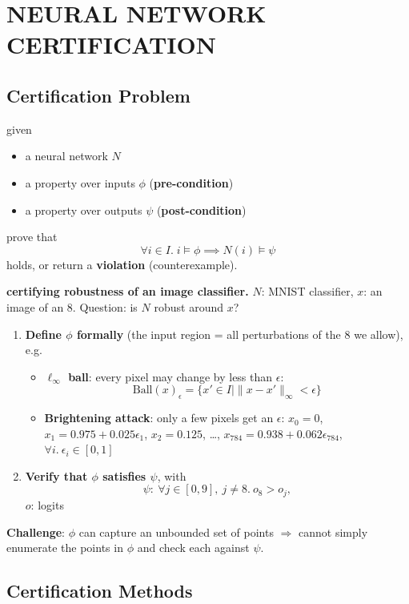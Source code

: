 \section{NEURAL NETWORK CERTIFICATION}

\subsection{Certification Problem}

 given
\begin{itemize}
  \item a neural network $N$
  \item a property over inputs $\phi$ (\textbf{pre-condition})
  \item a property over outputs $\psi$ (\textbf{post-condition})
\end{itemize}
prove that
\[
  \forall i \in I.\; i \models \phi \implies N(i) \models \psi
\]
holds, or return a \textbf{violation} (counterexample).

\example{} \textbf{certifying robustness of an image classifier.} $N$: MNIST classifier,
$x$: an image of an 8.
Question: is $N$ robust around $x$?
\begin{enumerate}
  \item \textbf{Define $\phi$ formally} (the input region = all perturbations of the 8 we allow), e.g.
    \begin{itemize}
      \item \textbf{$\ell_\infty$ ball}: every pixel may change by less than $\epsilon$:
        \[
          \text{Ball}(x)_\epsilon = \{x' \in I \mid \|x - x'\|_\infty < \epsilon\}
        \]
      \item \textbf{Brightening attack}: only a few pixels get an $\epsilon$:
        $x_0 = 0$, $x_1 = 0.975 + 0.025\epsilon_1$, $x_2 = 0.125$, \dots,
        $x_{784} = 0.938 + 0.062\epsilon_{784}$, $\forall i.\ \epsilon_i \in [0,1]$
    \end{itemize}
  \item \textbf{Verify that $\phi$ satisfies $\psi$}, with
    \[
      \psi:\ \forall j \in [0,9],\ j \neq 8.\ o_8 > o_j,
    \]
    $o$: logits
\end{enumerate}

\textbf{Challenge}: $\phi$ can capture an unbounded set of points $\Rightarrow$ cannot simply enumerate the points in
$\phi$ and check each against $\psi$.

\subsection{Certification Methods}

